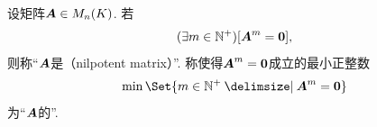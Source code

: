 \begin{definition}
设矩阵\(\boldsymbol{A} \in M_n(K)\).
若\begin{equation*}
	(\exists m\in\mathbb{N}^+)
	[\boldsymbol{A}^m = \boldsymbol0],
\end{equation*}
则称“\(\boldsymbol{A}\)是（nilpotent matrix）”.
称使得\(\boldsymbol{A}^m = \boldsymbol0\)成立的最小正整数\begin{equation*}
    \min\Set{ m\in\mathbb{N}^+ \given \vb{A}^m = \vb0 }
\end{equation*}为“\(\boldsymbol{A}\)的”.
\end{definition}

